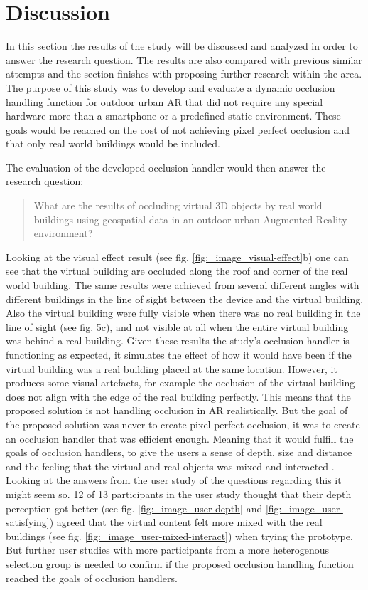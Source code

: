 \section{Discussion}
In this section the results of the study will be discussed and analyzed in order to answer the research question. The results are also  compared with previous similar attempts and the section finishes with proposing further research within the area. 
The purpose of this study was to develop and evaluate a dynamic occlusion handling function for outdoor urban AR that did not require any special hardware more than a smartphone or a predefined static environment. These goals would be reached on the cost of not achieving pixel perfect occlusion and that only real world buildings would be included. 

The evaluation of the developed occlusion handler would then answer the research question:
\begin{quote}
What are the results of occluding virtual 3D objects by real world buildings using geospatial data in an outdoor urban Augmented Reality environment?
\end{quote}

Looking at the visual effect result (see fig. \ref{fig:_image_visual-effect}b) one can see that the virtual building are occluded along the roof and corner of the real world building. The same results were achieved from several different angles with different buildings in the line of sight between the device and the virtual building. Also the virtual building were fully visible when there was no real building in the line of sight (see fig. 5c), and not visible at all when the entire virtual building was behind a real building. Given these results the study's occlusion handler is functioning as expected, it simulates the effect of how it would have been if the virtual building was a real building placed at the same location. However, it produces some visual artefacts, for example the occlusion of the virtual building does not align with the edge of the real building perfectly. This means that the proposed solution is not handling occlusion in AR realistically. But the goal of the proposed solution was never to create pixel-perfect occlusion, it was to create an occlusion handler that was efficient enough. Meaning that it would fulfill the goals of occlusion handlers, to give the users a sense of depth, size and distance and the feeling that the virtual and real objects was mixed and interacted \cite{shah2012occlusion}. Looking at the answers from the user study of the questions regarding this it might seem so. 12 of 13 participants in the user study thought that their depth perception got better (see fig. \ref{fig:_image_user-depth} and \ref{fig:_image_user-satisfying}) agreed that the virtual content felt more mixed with the real buildings (see fig. \ref{fig:_image_user-mixed-interact}) when trying the prototype. But further user studies with more participants from a more heterogenous selection group is needed to confirm if the proposed occlusion handling function reached the goals of occlusion handlers.

